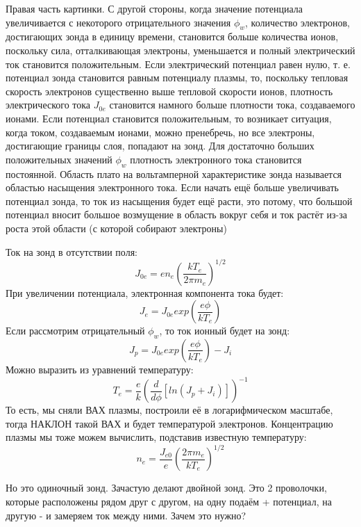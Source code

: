 \documentclass[10pt, a4paper]{article}
\begin{document}
Правая часть картинки.
С другой стороны, когда значение потенциала увеличивается с некоторого отрицательного значения $\phi_w$, количество электронов, достигающих зонда в единицу времени, становится больше количества ионов, поскольку сила, отталкивающая электроны, уменьшается и полный электрический ток становится положительным. Если электрический потенциал равен нулю, т. е. 
потенциал зонда становится равным потенциалу плазмы, то, поскольку тепловая скорость электронов существенно выше тепловой скорости ионов, плотность электрического тока $J_{0e}$ становится намного больше плотности тока, создаваемого ионами. Если потенциал становится положительным, то возникает ситуация, когда током, создаваемым ионами, можно пренебречь, но все электроны, достигающие границы слоя, попадают на зонд. Для достаточно больших положительных значений $\phi_w$ плотность электронного тока становится постоянной. Область плато на вольтамперной характеристике зонда называется областью насыщения электронного тока.
Если начать ещё больше увеличивать потенциал зонда, то ток из насыщения будет ещё расти, это потому, что большой потенциал вносит большое возмущение в область вокруг себя и ток растёт из-за роста этой области (с которой собирают электроны)

Ток на зонд в отсутствии поля:
\begin{equation}
	J_{0e}=e n_e (\frac{kT_e}{2 \pi m_e})^{1/2}
\end{equation}
При увеличении потенциала, электронная компонента тока будет:
\begin{equation}
	J_{e}=J_{0e}exp(\frac{e\phi}{kT_e})
\end{equation}
Если рассмотрим отрицательный $\phi_w$, то ток ионный будет на зонд:
\begin{equation}
	J_{p}=J_{0e}exp(\frac{e\phi}{kT_e})-J_i
\end{equation}
Можно выразить из уравнений температуру:
\begin{equation}
	T_e= \frac{e}{k} (\frac{d}{d \phi} [ln(J_p + J_i)])^{-1}
\end{equation}
То есть, мы сняли ВАХ плазмы, построили её в логарифмическом масштабе, тогда НАКЛОН такой ВАХ и будет температурой электронов.
Концентрацию плазмы мы тоже можем вычислить, подставив известную температуру:
\begin{equation}
	n_e= \frac{J_{e0}}{e} (\frac{2 \pi m_e}{kT_e})^{1/2}
\end{equation}


Но это одиночный зонд. Зачастую делают двойной зонд. Это 2 проволочки, которые расположены рядом друг с другом, на одну подаём + потенциал, на другую - и замеряем ток между ними. Зачем это нужно?
\end{document}
